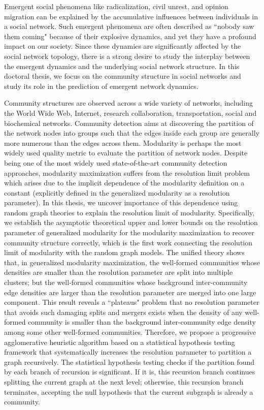
Emergent social phenomena like radicalization, civil unrest, and opinion migration can be explained by the accumulative influences between individuals in a social network. Such emergent phenomena are often described as ``nobody saw them coming" because of their explosive dynamics, and yet they have a profound impact on our society. Since these dynamics are significantly affected by the social network topology, there is a strong desire to study the interplay between the emergent dynamics and the underlying social network structure. In this doctoral thesis, we focus on the community structure in social networks and study its role in the prediction of emergent network dynamics.

Community structures are observed across a wide variety of networks, including the World Wide Web, Internet, research collaboration, transportation, social and biochemical networks. Community detection aims at discovering the partition of the network nodes into groups such that the edges inside each group are generally more numerous than the edges across them. Modularity is perhaps the most widely used quality metric to evaluate the partition of network nodes. Despite being one of the most widely used state-of-the-art community detection approaches, modularity maximization suffers from the resolution limit problem which arises due to the implicit dependence of the modularity definition on a constant (explicitly defined in the generalized modularity as a resolution parameter). In this thesis, we uncover importance of this dependence  using random graph theories to explain the resolution limit of modularity. Specifically, we establish the asymptotic theoretical upper and lower bounds on the resolution parameter of generalized modularity for the modularity maximization to recover community structure correctly, which is the first work connecting the resolution limit of modularity with the random graph models. The unified theory shows that, in generalized modularity maximization, the well-formed communities whose densities are smaller than the resolution parameter are split into multiple clusters; but the well-formed communities whose background inter-community edge densities are larger than the resolution parameter are merged into one large component. This result reveals a ``plateaus" problem that no resolution parameter that avoids such damaging splits and mergers  exists when the density of any well-formed community is smaller than the background inter-community edge density among some other well-formed communities. Therefore, we propose a progressive agglomerative heuristic algorithm based on a statistical hypothesis testing framework that systematically increases the resolution parameter to partition a graph recursively. The statistical hypothesis testing checks if the partition found by each branch of recursion is significant. If it is, this recursion branch continues splitting the current graph at the next level; otherwise, this recursion branch terminates, accepting the null hypothesis that the current subgraph is already a community.

